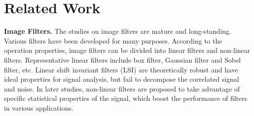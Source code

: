 \documentclass[twocolumn]{svjour3}          %
\begin{document}
\section{Related Work} \label{sec2}

\textbf{Image Filters.}
%
The studies on image filters are mature and long-standing. Various filters have been developed for many purposes. According to the operation properties, image filters can be divided into linear filters and non-linear filters. Representative linear filters include box filter, Gaussian filter and Sobel filter, etc. Linear shift invariant filters (LSI) are theoretically robust and have ideal properties for signal analysis, but fail to decompose the correlated signal and noise. In later studies, non-linear filters \cite{nonlinear1,nonlinear2,nonlinear3} are proposed to take advantage of specific statistical properties of the signal, which boost the performance of filters in various applications.
\end{document}
